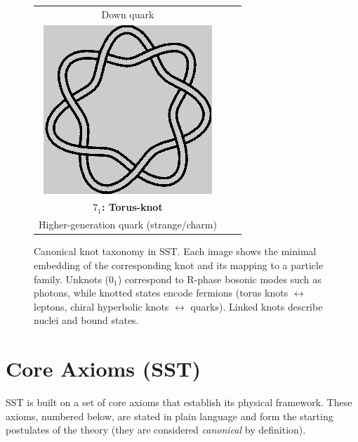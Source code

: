 \documentclass[reprint,aps,onecolumn,nofootinbib]{revtex4-2}
\begin{document}
\begin{figure}[htbp]
\begin{tabular}{ccc}
        \small Down quark \\[4pt]
        \includegraphics[width=0.04\linewidth]{7_1} & & \\
        \textbf{$7_1$: Torus-knot}  & & \\
        \small Higher-generation quark (strange/charm) & &
        \end{tabular}
        \caption{Canonical knot taxonomy in SST. Each image shows the minimal embedding of the corresponding knot and its mapping to a particle family. Unknots (0$_1$) correspond to R-phase bosonic modes such as photons, while knotted states encode fermions (torus knots $\leftrightarrow$ leptons, chiral hyperbolic knots $\leftrightarrow$ quarks). Linked knots describe nuclei and bound states.}
        \label{fig:knot-taxonomy}
        \end{figure}

	\section{Core Axioms (SST)}
	SST is built on a set of core axioms that establish its physical framework. These axioms, numbered below, are stated in plain language and form the starting postulates of the theory (they are considered \emph{canonical} by definition).
\end{document}
